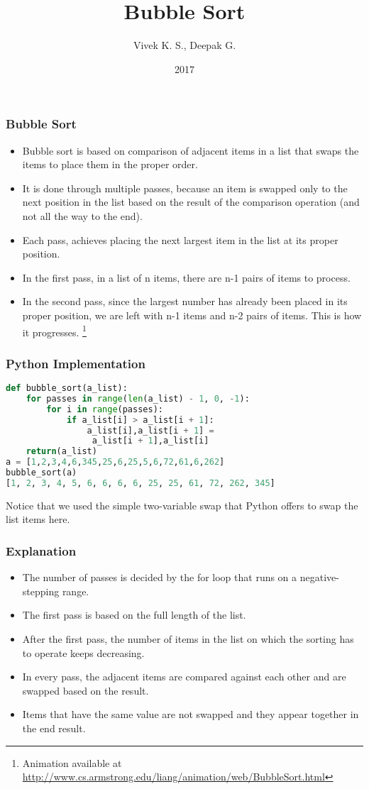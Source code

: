 \documentclass{beamer}
\title{Bubble Sort}
\author{Vivek K. S., Deepak G.}
\institute{Information Systems Decision Sciences (ISDS)\\
MUMA College of Business\\
University of South Florida \\
Tampa, Florida}
\date{2017}
\begin{document}
\frame{\titlepage}

\begin{frame}
\frametitle{Bubble Sort}
\begin{itemize}
\item Bubble sort is based on comparison of adjacent items in a list that swaps the items to place them in the proper order.
\item It is done through multiple passes, because an item is swapped only to the next position in the list based on the result of the comparison operation (and not all the way to the end).
\item Each pass, achieves placing the next largest item in the list at its proper position.
\item In the first pass, in a list of n items, there are n-1 pairs of items to process.
\item In the second pass, since the largest number has already been placed in its proper  position, we are left with n-1 items and n-2 pairs of items. This is how it progresses.
\footnote{Animation available at \url{http://www.cs.armstrong.edu/liang/animation/web/BubbleSort.html}}
\end{itemize}
\end{frame}

\begin{frame}[fragile]
\frametitle{Python Implementation}
\begin{lstlisting}[language=Python]
def bubble_sort(a_list):
    for passes in range(len(a_list) - 1, 0, -1):
        for i in range(passes):
            if a_list[i] > a_list[i + 1]:
                a_list[i],a_list[i + 1] =
                 a_list[i + 1],a_list[i]
    return(a_list)
a = [1,2,3,4,6,345,25,6,25,5,6,72,61,6,262]
bubble_sort(a)
[1, 2, 3, 4, 5, 6, 6, 6, 6, 25, 25, 61, 72, 262, 345]
\end{lstlisting}
Notice that we used the simple two-variable swap that Python offers to swap the list items here.
\end{frame}

\begin{frame}
\frametitle{Explanation}
\begin{itemize}
\item The number of passes is decided by the for loop that runs on a negative-stepping range.
\item The first pass is based on the full length of the list.
\item After the first pass, the number of items in the list on which the sorting has to operate keeps decreasing.
\item In every pass, the adjacent items are compared against each other and are swapped based on the result.
\item Items that have the same value are not swapped and they appear together in the end result.
\end{itemize}
\end{frame}
\end{document}

